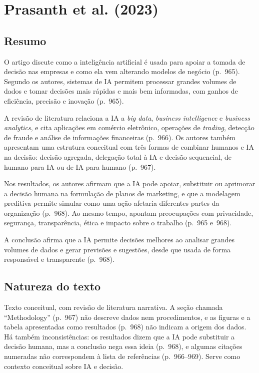 \section{Prasanth et al. (2023)}

\subsection*{Resumo}

O artigo discute como a inteligência artificial é usada para apoiar a tomada de decisão nas empresas e como ela vem alterando modelos de negócio (p.~965). Segundo os autores, sistemas de IA permitem processar grandes volumes de dados e tomar decisões mais rápidas e mais bem informadas, com ganhos de eficiência, precisão e inovação (p.~965).

A revisão de literatura relaciona a IA a \emph{big data}, \emph{business intelligence} e \emph{business analytics}, e cita aplicações em comércio eletrônico, operações de \emph{trading}, detecção de fraude e análise de informações financeiras (p.~966). Os autores também apresentam uma estrutura conceitual com três formas de combinar humanos e IA na decisão: decisão agregada, delegação total à IA e decisão sequencial, de humano para IA ou de IA para humano (p.~967).

Nos resultados, os autores afirmam que a IA pode apoiar, substituir ou aprimorar a decisão humana na formulação de planos de marketing, e que a modelagem preditiva permite simular como uma ação afetaria diferentes partes da organização (p.~968). Ao mesmo tempo, apontam preocupações com privacidade, segurança, transparência, ética e impacto sobre o trabalho (p.~965 e~968).

A conclusão afirma que a IA permite decisões melhores ao analisar grandes volumes de dados e gerar previsões e sugestões, desde que usada de forma responsável e transparente  (p.~968).

\subsection*{Natureza do texto}

Texto conceitual, com revisão de literatura narrativa. A seção chamada ``Methodology'' (p.~967) não descreve dados nem procedimentos, e as figuras e a tabela apresentadas como resultados (p.~968) não indicam a origem dos dados. Há também inconsistências: os resultados dizem que a IA pode substituir a decisão humana, mas a conclusão nega essa ideia (p.~968), e algumas citações numeradas não correspondem à lista de referências (p.~966--969). Serve como contexto conceitual sobre IA e decisão.

